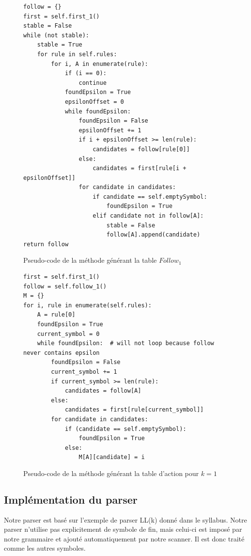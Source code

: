 \documentclass[a4paper,10pt]{article}
\begin{document}
\begin{figure}[H]
\begin{lstlisting}
follow = {}
first = self.first_1()
stable = False
while (not stable):
	stable = True
	for rule in self.rules:
		for i, A in enumerate(rule):
			if (i == 0):
				continue
			foundEpsilon = True
			epsilonOffset = 0
			while foundEpsilon:
				foundEpsilon = False
				epsilonOffset += 1
				if i + epsilonOffset >= len(rule):
					candidates = follow[rule[0]]
				else:
					candidates = first[rule[i + epsilonOffset]]
				for candidate in candidates:
					if candidate == self.emptySymbol:
						foundEpsilon = True
					elif candidate not in follow[A]:
						stable = False
						follow[A].append(candidate)
return follow
\end{lstlisting}
\fontfamily{}
\caption{Pseudo-code de la méthode générant la table $Follow_1$}
\label{lst:follow_1}
\end{figure}

\begin{figure}[H]
\begin{lstlisting}
first = self.first_1()
follow = self.follow_1()
M = {}
for i, rule in enumerate(self.rules):
	A = rule[0]
	foundEpsilon = True
	current_symbol = 0
	while foundEpsilon:  # will not loop because follow never contains epsilon
		foundEpsilon = False
		current_symbol += 1
		if current_symbol >= len(rule):
			candidates = follow[A]
		else:
			candidates = first[rule[current_symbol]]
		for candidate in candidates:
			if (candidate == self.emptySymbol):
				foundEpsilon = True
			else:
				M[A][candidate] = i
\end{lstlisting}
\fontfamily{}
\caption{Pseudo-code de la méthode générant la table d'action pour $k = 1$}
\label{lst:actionTable}
\end{figure}

\subsection{Implémentation du parser}

\label{anx:parserImpl}

Notre parser est basé sur l'exemple de parser LL(k) donné dans le syllabus. Notre parser n'utilise pas explicitement de symbole de fin, mais celui-ci est imposé par notre grammaire et ajouté automatiquement par notre scanner. Il est donc traité comme les autres symboles.
\end{document}
